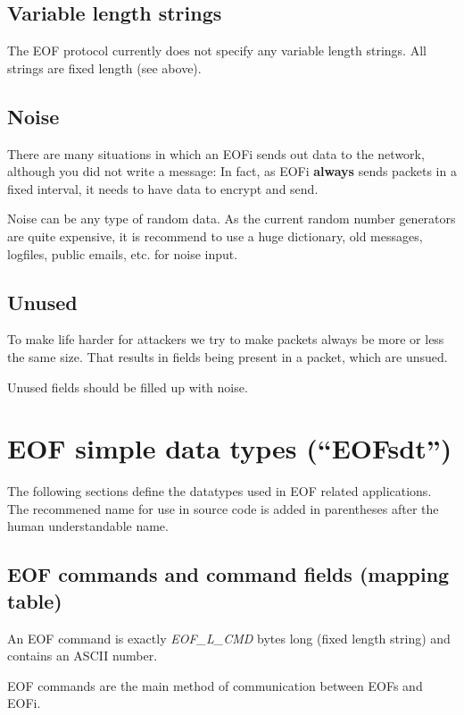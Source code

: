\subsection{Variable length strings}
The EOF protocol currently does not specify any variable length strings.
All strings are fixed length (see above).
\subsection{Noise}
There are many situations in which an EOFi sends out data to the network,
although you did not write a message: In fact, as EOFi \textbf{always}
sends packets in a fixed interval, it needs to have data to encrypt and send.

Noise can be any type of random data. As the current random number generators
are quite expensive, it is recommend to use a huge dictionary, old
messages, logfiles, public emails, etc. for noise input.
\subsection{Unused}
To make life harder for attackers we try to make packets always be more or
less the same size. That results in fields being present in a packet, which
are unsued.

Unused fields should be filled up with noise.
\section{EOF simple data types ("`EOFsdt"')}
The following sections define the datatypes used in EOF related
applications. The recommened name for use in source
code is added in parentheses after the human understandable name.
\subsection{EOF commands and command fields (mapping table)}
An EOF command is exactly \emph{EOF\_L\_CMD} bytes long (fixed length string)
and contains an ASCII number.

EOF commands are the main method of communication between EOFs and EOFi.

